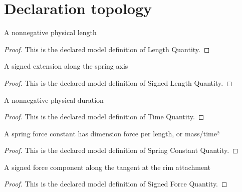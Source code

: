 \section{Declaration topology}
\begin{definition}
  \label{def:physics:phyx-mini-0269:phyxminiproblems-problemphyxmini0269-lengthquantity}
  A nonnegative physical length
\end{definition}
\begin{proof}
  This is the declared model definition of Length Quantity.
\end{proof}
\begin{definition}
  \label{def:physics:phyx-mini-0269:phyxminiproblems-problemphyxmini0269-signedlengthquantity}
  A signed extension along the spring axis
\end{definition}
\begin{proof}
  This is the declared model definition of Signed Length Quantity.
\end{proof}
\begin{definition}
  \label{def:physics:phyx-mini-0269:phyxminiproblems-problemphyxmini0269-timequantity}
  A nonnegative physical duration
\end{definition}
\begin{proof}
  This is the declared model definition of Time Quantity.
\end{proof}
\begin{definition}
  \label{def:physics:phyx-mini-0269:phyxminiproblems-problemphyxmini0269-springconstantquantity}
  A spring force constant has dimension force per length, or mass/time²
\end{definition}
\begin{proof}
  This is the declared model definition of Spring Constant Quantity.
\end{proof}
\begin{definition}
  \label{def:physics:phyx-mini-0269:phyxminiproblems-problemphyxmini0269-signedforcequantity}
  A signed force component along the tangent at the rim attachment
\end{definition}
\begin{proof}
  This is the declared model definition of Signed Force Quantity.
\end{proof}
